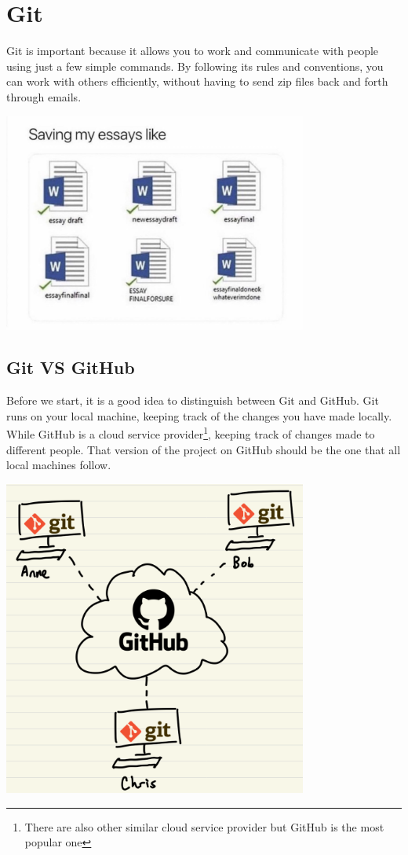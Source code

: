 \chapter{Git}

Git is important because it allows you to work and communicate with people using just a few simple commands. By following its rules and conventions, you can work with others efficiently, without having to send zip files back and forth through emails. 

\begin{center}
\includegraphics[width=10cm]{images/ch0-version-control.jpeg}
\end{center}

\section{Git VS GitHub}

Before we start, it is a good idea to distinguish between Git and GitHub. Git runs on your local machine, keeping track of the changes you have made locally. While GitHub is a cloud service provider\footnote{There are also other similar cloud service provider but GitHub is the most popular one}, keeping track of changes made to different people. That version of the project on GitHub should be the one that all local machines follow.

\begin{center}
\includegraphics[width=10cm]{images/ch3-gitgithub.png}
\end{center}

